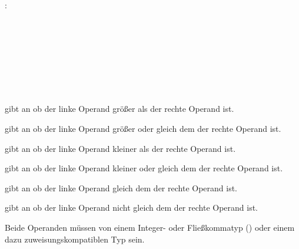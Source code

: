 :\label{asdr_vergleich_operanden}\\
\hspace*{1cm}\glq\Gt{>}\grq  {} \\
\hspace*{1cm}\glq\Gt{>}\grq  {}  \\
\hspace*{1cm}\glq\Gt{>=}\grq  {} \\
\hspace*{1cm}\glq\Gt{>=}\grq  {}  \\
\hspace*{1cm}\glq\Gt{<}\grq  {} \\
\hspace*{1cm}\glq\Gt{<}\grq  {}  \\
\hspace*{1cm}\glq\Gt{<=}\grq  {} \\
\hspace*{1cm}\glq\Gt{<=}\grq  {}  \\

\op{>} gibt an ob der linke Operand größer als der rechte Operand ist.

\op{>=} gibt an ob der linke Operand größer oder gleich dem der rechte Operand ist.

\op{<} gibt an ob der linke Operand kleiner als der rechte Operand ist.

\op{<=} gibt an ob der linke Operand kleiner oder gleich dem der rechte Operand ist.

\op{==} gibt an ob der linke Operand gleich dem der rechte Operand ist.

\op{!=} gibt an ob der linke Operand nicht gleich dem der rechte Operand ist.

Beide Operanden müssen von einem Integer- oder Fließkommatyp () oder einem
dazu zuweisungskompatiblen Typ sein.

